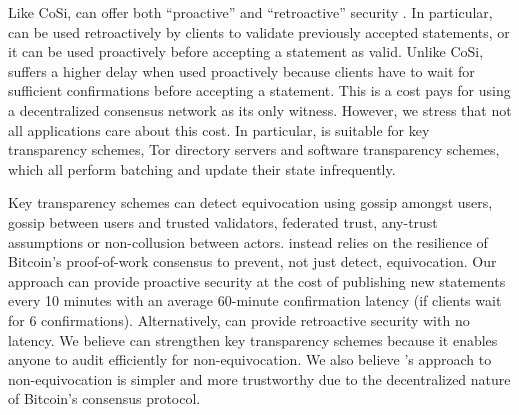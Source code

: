 Like CoSi, \Sys can offer both ``proactive'' and ``retroactive'' security \cite{cosi}.
In particular, \Sys can be used retroactively by clients to validate previously accepted statements, or it can be used proactively before accepting a statement as valid.
Unlike CoSi, \Sys suffers a higher delay when used proactively because clients have to wait for sufficient confirmations before accepting a statement.
This is a cost \Sys pays for using a decentralized consensus network as its only witness.
However, we stress that not all applications care about this cost.
In particular, \Sys is suitable for key transparency schemes, Tor directory servers and software transparency schemes, which all perform batching and update their state infrequently.

Key transparency schemes can detect equivocation using gossip amongst users\cite{ctgossip,ect,coniks,dtki}, gossip between users and trusted validators\cite{aki}, federated trust\cite{coniks}, any-trust assumptions\cite{arpki} or non-collusion between actors\cite{arpki, aki}.
\Sys instead relies on the resilience of Bitcoin's proof-of-work consensus to prevent, not just detect, equivocation.
Our approach can provide proactive security\cite{cosi} at the cost of publishing new statements every 10 minutes with an average 60-minute confirmation latency (if clients wait for 6 confirmations).
Alternatively, \Sys can provide retroactive security with no latency.
We believe \Sys can strengthen key transparency schemes because it enables anyone to audit efficiently for non-equivocation.
We also believe \Sys's approach to non-equivocation is simpler and more trustworthy due to the decentralized nature of Bitcoin's consensus protocol.

